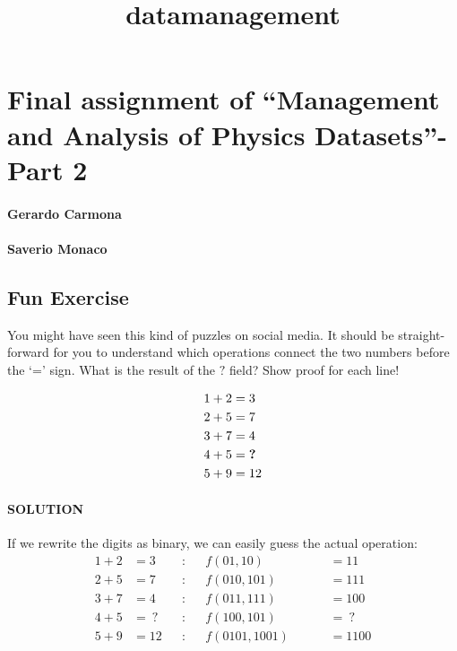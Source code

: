 \documentclass[11pt]{article}
\title{datamanagement}
\begin{document}
    
    \maketitle
    
    

    
    \hypertarget{final-assignment-of-management-and-analysis-of-physics-datasets--part-2}{%
\section{Final assignment of ``Management and Analysis of Physics
Datasets''- Part
2}\label{final-assignment-of-management-and-analysis-of-physics-datasets--part-2}}

    \hypertarget{gerardo-carmona}{%
\paragraph{Gerardo Carmona}\label{gerardo-carmona}}

\hypertarget{saverio-monaco}{%
\paragraph{Saverio Monaco}\label{saverio-monaco}}

    \hypertarget{fun-exercise}{%
\subsection{Fun Exercise}\label{fun-exercise}}

You might have seen this kind of puzzles on social media. It should be
straight-forward for you to understand which operations connect the two
numbers before the `=' sign. What is the result of the
\(\boldsymbol{?}\) field? Show proof for each line!

\begin{align*}& 1 + 2 = 3 \\ & 2 + 5 = 7 \\ & 3 + 7 = 4 \\ & 4 + 5 = \space\boldsymbol{?} \\ & 5 + 9 = 12\end{align*}

    \hypertarget{solution}{%
\paragraph{SOLUTION}\label{solution}}

If we rewrite the digits as binary, we can easily guess the actual
operation: 
\begin{align*}
1 + 2 &= 3&&: &&f(01,10)&& &&=11\\
2 + 5 &= 7&&: &&f(010,101)&& &&=111\\
3 + 7 &= 4&&: &&f(011,111)&& &&=100\\
4 + 5 &=\ ?&&: &&f(100,101)&& &&=\ ?\\
5 + 9 &= 12&&: &&f(0101,1001)&& &&=1100
\end{align*}
\end{document}
